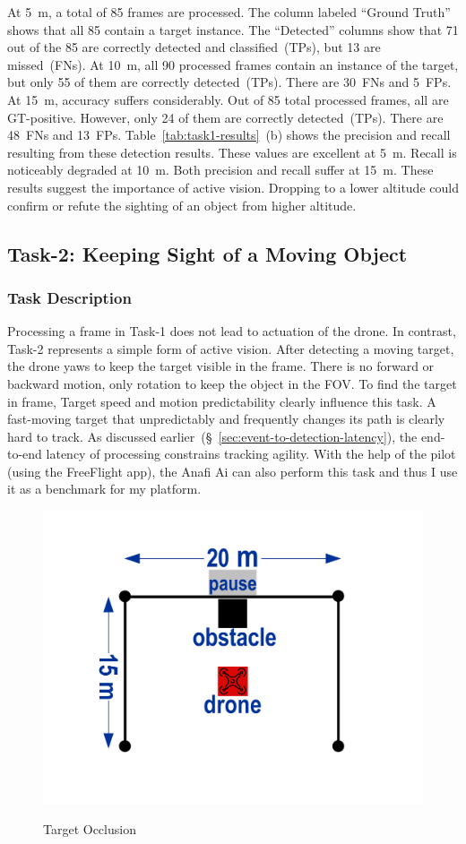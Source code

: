 At 5~m, a total of 85 frames are processed.  The column labeled
``Ground Truth'' shows that all 85 contain a target instance.  The
``Detected'' columns show that 71 out of the 85 are correctly detected
and classified~(TPs), but 13 are missed~(FNs).  At 10~m, all 90
processed frames contain an instance of the target, but only 55 of
them are correctly detected~(TPs).  There are 30~FNs and 5~FPs.  At
15~m, accuracy suffers considerably.  Out of 85 total processed
frames, all are GT-positive.  However, only 24 of them are correctly
detected~(TPs).  There are 48~FNs and 13~FPs.
Table~\ref{tab:task1-results}~(b) shows the precision and recall
resulting from these detection results.  These values are excellent at
5~m.  Recall is noticeably degraded at 10~m.  Both precision and
recall suffer at 15~m.  These results suggest the importance of active
vision. Dropping to a lower altitude could confirm
or refute the sighting of an object from higher altitude. 

\subsection{Task-2: Keeping Sight of  a Moving Object}
\label{sec:task2}

\subsubsection{Task Description}
\label{sec:task2-desc}

Processing a frame in Task-1 does not lead to actuation of the drone.
In contrast, Task-2 represents a simple form of active vision. After
detecting a moving target, the drone yaws to keep the target visible
in the frame. There is no forward or backward motion, only rotation to
keep the object in the FOV. To find the target in frame,  Target speed and motion predictability
clearly influence this task.  A fast-moving target that unpredictably
and frequently changes its path is clearly hard to track.  As
discussed earlier~(\S~\ref{sec:event-to-detection-latency}), the end-to-end latency of
processing constrains tracking agility. With the help of the pilot
(using the FreeFlight app), the Anafi Ai can also perform this task
and thus I use it as a benchmark for my platform.

\begingroup
\setlength{\columnsep}{4pt}
\begin{figure}
\centering
\includegraphics[width=0.4\linewidth]{chapter4/FIGS/fig-yaw-ushape.pdf}\\
\caption{Target Occlusion}
\label{fig:yaw}
\end{figure}


